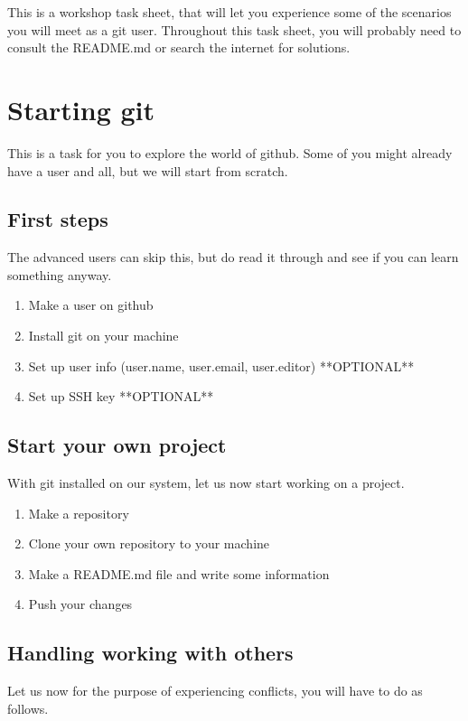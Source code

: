 \documentclass[12 pt,a4paper]{article}
\begin{document}
\noindent This is a workshop task sheet, 
that will let you experience some of the scenarios you will meet as a git user.
Throughout this task sheet,
you will probably need to consult the README.md or search the internet for solutions.

\section*{Starting git}
This is a task for you to explore the world of github.
Some of you might already have a user and all, 
but we will start from scratch.

\subsection*{First steps}
The advanced users can skip this,
but do read it through and see if you can learn something anyway.
\begin{enumerate}
  \item Make a user on github
  \item Install git on your machine
  \item Set up user info (user.name, user.email, user.editor) **OPTIONAL**
  \item Set up SSH key **OPTIONAL**
\end{enumerate}

\subsection*{Start your own project}
With git installed on our system, let us now start working on a project.
\begin{enumerate}
\item Make a repository
\item Clone your own repository to your machine
\item Make a README.md file and write some information
\item Push your changes
\end{enumerate}

\subsection*{Handling working with others}
Let us now for the purpose of experiencing conflicts, you will have to do as follows.
\end{document}
